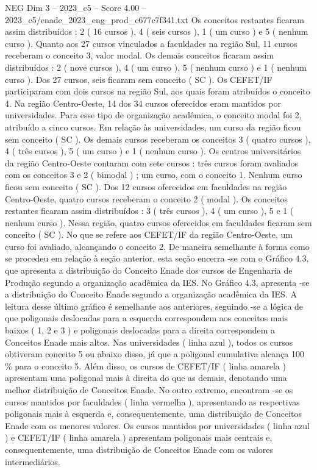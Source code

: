 \begin{textsample}{NEG Dim 3 – 2023\_c5 – Score 4.00 – 2023\_c5/enade\_2023\_eng\_prod\_c677c7f341.txt}
Os conceitos restantes ficaram assim distribuídos : 2 ( 16 cursos ), 4 ( seis cursos ), 1 ( um curso ) e 5 ( nenhum curso ).
Quanto aos 27 cursos vinculados a faculdades na região Sul, 11 cursos receberam o conceito 3, valor modal.
Os demais conceitos ficaram assim distribuídos : 2 ( nove cursos ), 4 ( um curso ), 5 ( nenhum curso ) e 1 ( nenhum curso ).
Dos 27 cursos, seis ficaram sem conceito ( SC ).
Os CEFET/IF participaram com dois cursos na região Sul, aos quais foram atribuídos o conceito 4.
Na região Centro-Oeste, 14 dos 34 cursos oferecidos eram mantidos por universidades.
Para esse tipo de organização acadêmica, o conceito modal foi 2, atribuído a cinco cursos.
Em relação às universidades, um curso da região ficou sem conceito ( SC ).
Os demais cursos receberam os conceitos 3 ( quatro cursos ), 4 ( três cursos ), 5 ( um curso ) e 1 ( nenhum curso ).
Os centros universitários da região Centro-Oeste contaram com sete cursos : três cursos foram avaliados com os conceitos 3 e 2 ( bimodal ) ; um curso, com o conceito 1.
Nenhum curso ficou sem conceito ( SC ).
Dos 12 cursos oferecidos em faculdades na região Centro-Oeste, quatro cursos receberam o conceito 2 ( modal ).
Os conceitos restantes ficaram assim distribuídos : 3 ( três cursos ), 4 ( um curso ), 5 e 1 ( nenhum curso ).
Nessa região, quatro cursos oferecidos em faculdades ficaram sem conceito ( SC ).
No que se refere aos CEFET/IF da região Centro-Oeste, um curso foi avaliado, alcançando o conceito 2.
De maneira semelhante à forma como se procedeu em relação à seção anterior, esta seção encerra -se com o Gráfico 4.3, que apresenta a distribuição do Conceito Enade dos cursos de Engenharia de Produção segundo a organização acadêmica da IES.
No Gráfico 4.3, apresenta -se a distribuição do Conceito Enade segundo a organização acadêmica da IES.
A leitura desse último gráfico é semelhante aos anteriores, seguindo -se a lógica de que poligonais deslocadas para a esquerda correspondem aos conceitos mais baixos ( 1, 2 e 3 ) e poligonais deslocadas para a direita correspondem a Conceitos Enade mais altos.
Nas universidades ( linha azul ), todos os cursos obtiveram conceito 5 ou abaixo disso, já que a poligonal cumulativa alcança 100 \% para o conceito 5.
Além disso, os cursos de CEFET/IF ( linha amarela ) apresentam uma poligonal mais à direita do que as demais, denotando uma melhor distribuição de Conceitos Enade.
No outro extremo, encontram -se os cursos mantidos por faculdades ( linha vermelha ), apresentando as respectivas poligonais mais à esquerda e, consequentemente, uma distribuição de Conceitos Enade com os menores valores.
Os cursos mantidos por universidades ( linha azul ) e CEFET/IF ( linha amarela ) apresentam poligonais mais centrais e, consequentemente, uma distribuição de Conceitos Enade com os valores intermediários.

\end{textsample}
